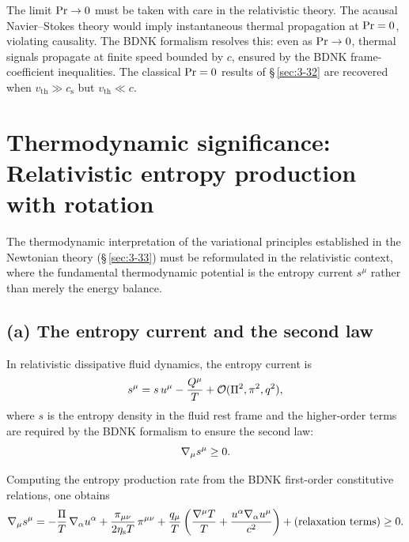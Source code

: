 \begin{causalitycheck}
The limit $\mathrm{Pr} \to 0$ must be taken with care in the relativistic theory.
The acausal Navier--Stokes theory would imply instantaneous thermal
propagation at $\mathrm{Pr} = 0$, violating causality.  The BDNK
formalism resolves this: even as $\mathrm{Pr} \to 0$, thermal signals propagate
at finite speed bounded by $c$, ensured by the BDNK frame-coefficient
inequalities.  The classical $\mathrm{Pr} = 0$ results of \S\,\ref{sec:3-32} are
recovered when $v_{\mathrm{th}} \gg c_{\mathrm{s}}$ but
$v_{\mathrm{th}} \ll c$.
\end{causalitycheck}


\section{Thermodynamic significance: Relativistic entropy production
with rotation}\label{sec:rel-3-33}

The thermodynamic interpretation of the variational principles
established in the Newtonian theory (\S\,\ref{sec:3-33}) must be
reformulated in the relativistic context, where the fundamental
thermodynamic potential is the entropy current $s^{\mu}$ rather than
merely the energy balance.

\subsection*{(a) The entropy current and the second law}

In relativistic dissipative fluid dynamics, the entropy current is
\begin{equation}\label{eq:rel-3-281}
  s^{\mu} = s\,u^{\mu} - \frac{Q^{\mu}}{T}
  + \mathcal{O}(\Pi^2, \pi^2, q^2),
\end{equation}
where $s$ is the entropy density in the fluid rest frame and the
higher-order terms are required by the BDNK formalism to
ensure the second law:
\begin{equation}\label{eq:rel-3-282}
  \nabla_{\mu} s^{\mu} \geq 0.
\end{equation}

Computing the entropy production rate from the BDNK
first-order constitutive relations, one obtains
\begin{equation}\label{eq:rel-3-283}
  \nabla_{\mu} s^{\mu} = -\frac{\Pi}{T}\,\nabla_{\alpha} u^{\alpha}
  + \frac{\pi_{\mu\nu}}{2\eta_{\mathrm{s}} T}\,\pi^{\mu\nu}
  + \frac{q_{\mu}}{T}\left(\frac{\nabla^{\mu} T}{T}
  + \frac{u^{\alpha}\nabla_{\alpha} u^{\mu}}{c^2}\right)
  + \text{(relaxation terms)} \geq 0.
\end{equation}

